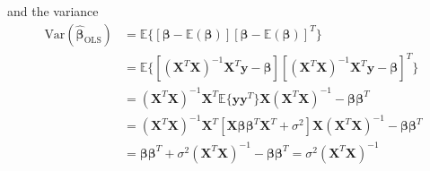 \documentclass{article}
\begin{document}
	and the variance
	\begin{align*}
			\text{Var}(\hat{\bm\beta}_\text{OLS})&=\mathbb E\{ [\bm\beta-\mathbb E(\bm\beta)] [\bm\beta-\mathbb E(\bm\beta)]^T\}\\
			&=\mathbb E\{ [(\bm X^T\bm X)^{-1}\bm X^T\bm y-\bm\beta][(\bm X^T\bm X)^{-1}\bm X^T\bm y-\bm\beta]^T\}\\
			&=(\bm X^T\bm X)^{-1}\bm X^T\mathbb E\{\bm y\bm y^T\}\bm X(\bm X^T\bm X)^{-1}-\bm\beta\bm\beta^T\\
			&=(\bm X^T\bm X)^{-1}\bm X^T[\bm X\bm\beta\bm\beta^T\bm X^T+\sigma^2]\bm X(\bm X^T\bm X)^{-1}-\bm\beta\bm\beta^T\\
			&=\bm\beta\bm\beta^T+\sigma^2(\bm X^T\bm X)^{-1}-\bm\beta\bm\beta^T=\sigma^2(\bm X^T \bm X)^{-1}
	\end{align*}
	
	
\end{document}
